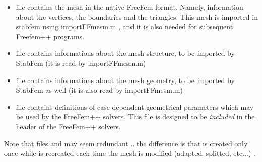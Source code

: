 \begin{itemize}
\item file  contains the mesh in the native FreeFem format. Namely, information about the vertices, the boundaries and the triangles. This mesh is imported in stabfem using importFFmesm.m , and it is also needed for subsequent Freefem++ programs.


\item file  contains informations about the mesh structure, to be imported by StabFem (it is read by importFFmesm.m)

\item file   contains informations about the mesh geometry, to be imported by StabFem as well  (it is also read by importFFmesm.m)

\item file  contains definitions of case-dependent geometrical parameters which may be used by the FreeFem++ solvers.
This file is designed to be {\em included } in the header of the FreeFem++ solvers.
\end{itemize}

Note that files  and   may seem redundant... the difference is that   is created only once 
while   is recreated each time the mesh is modified (adapted, splitted, etc...) .











